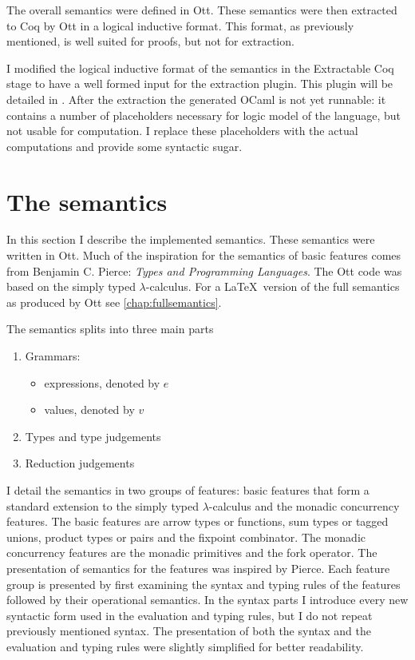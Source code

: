\documentclass[12pt,twoside,notitlepage]{report}
\theoremstyle{plain}%
\theoremstyle{definition}
\theoremstyle{remark}
\begin{document}
The overall semantics were defined in Ott. These semantics were then extracted to Coq by Ott in a logical inductive format. This format, as previously mentioned, is well suited for proofs, but not for extraction. 

I modified the logical inductive format of the semantics in the Extractable Coq stage to have a well formed input for the extraction plugin. This plugin will be detailed in . After the extraction the generated OCaml is not yet runnable: it contains a number of placeholders necessary for logic model of the language, but not usable for computation. I replace these placeholders with the actual computations and provide some syntactic sugar.
\section{The semantics}\label{sec:the-semanticssec:the-semantics}
In this section I describe the implemented semantics. These semantics were written in Ott.  Much of the inspiration for the semantics of basic features comes from Benjamin C. Pierce: \textit{Types and Programming Languages}\cite{pierce2002types}. The Ott code was based on the simply typed $ \lambda $-calculus. For a \LaTeX\, version of the full semantics as produced by Ott see \cref{chap:fullsemantics}.

 
The semantics splits into three main parts
\begin{enumerate}
\item{Grammars:\begin{itemize}
\item{expressions, denoted by $ e $}
\item{values, denoted by $ v $}
\end{itemize}}
\item{Types and type judgements}
\item{Reduction judgements}
\end{enumerate}

I detail the semantics in two groups of features: basic features that form a standard extension to the simply typed $ \lambda $-calculus and the monadic concurrency features. The basic features are arrow types or functions, sum types or tagged unions, product types or pairs and the fixpoint combinator. The monadic concurrency features are the monadic primitives and the fork operator. The presentation of semantics for the features was inspired by Pierce\cite{pierce2002types}. Each feature group is presented by first examining the syntax and typing rules of the features followed by their operational semantics. In the syntax parts I introduce every new syntactic form used in the evaluation and typing rules, but I do not repeat previously mentioned syntax. The presentation of both the syntax and the evaluation and typing rules were slightly simplified for better readability.   
\end{document}
